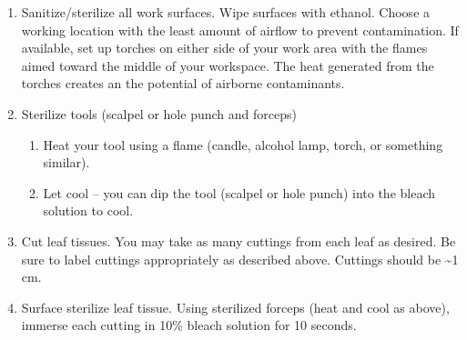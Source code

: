 \documentclass[
  letterpaper,
  DIV=11,
  numbers=noendperiod]{scrreprt}
\providecommand{\tightlist}{%
  \setlength{\itemsep}{0pt}\setlength{\parskip}{0pt}}
\begin{document}
\begin{enumerate}
\def\labelenumi{\arabic{enumi}.}
\tightlist
\item
  Sanitize/sterilize all work surfaces. Wipe surfaces with ethanol.
  Choose a working location with the least amount of airflow to prevent
  contamination. If available, set up torches on either side of your
  work area with the flames aimed toward the middle of your workspace.
  The heat generated from the torches creates an the potential of
  airborne contaminants.
\item
  Sterilize tools (scalpel or hole punch and forceps)

  \begin{enumerate}
  \def\labelenumii{\alph{enumii}.}
  \tightlist
  \item
    Heat your tool using a flame (candle, alcohol lamp, torch, or
    something similar).
  \item
    Let cool -- you can dip the tool (scalpel or hole punch) into the
    bleach solution to cool.
  \end{enumerate}
\item
  Cut leaf tissues. You may take as many cuttings from each leaf as
  desired. Be sure to label cuttings appropriately as described above.
  Cuttings should be \textasciitilde1 cm.
\item
  Surface sterilize leaf tissue. Using sterilized forceps (heat and cool
  as above), immerse each cutting in 10\% bleach solution for 10
  seconds.


\end{enumerate}
\end{document}
